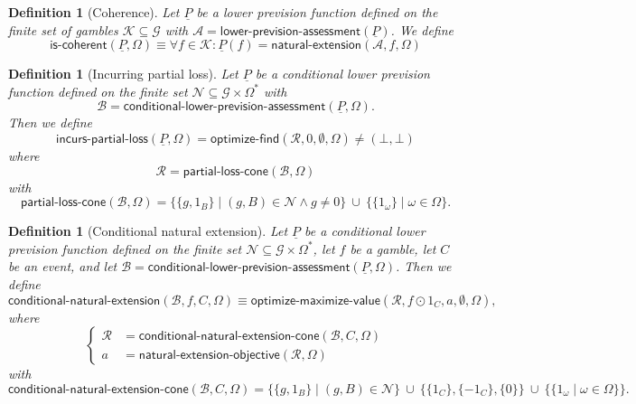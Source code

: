 \documentclass{article}
\theoremstyle{mytheorem}
\newtheorem{definition}[theorem]{Definition}
\newcommand{\func}[1]{\ensuremath{\textsf{#1}}} %
\newcommand{\set}[1]{\ensuremath{\{ #1 \} }} %
\begin{document}
\begin{definition}[Coherence]
Let $\underline{P}$ be a lower prevision function defined on the finite set of gambles $\mathcal{K} \subseteq \mathcal{G}$ with $\mathcal{A} = \func{lower-prevision-assessment}(\underline{P})$. We define
\[
  \func{is-coherent}(\underline{P}, \Omega) \equiv
  \forall f \in \mathcal{K}: \underline{P}(f) = \func{natural-extension}(\mathcal{A}, f, \Omega)
\]
\end{definition}

\begin{definition}[Incurring partial loss]
Let $\underline{P}$ be a conditional lower prevision function defined on the finite set $\mathcal{N} \subseteq \mathcal{G} \times \Omega^\ast$ with
\[\mathcal{B} = \func{conditional-lower-prevision-assessment}(\underline{P}, \Omega).
\]
Then we define
\[
  \func{incurs-partial-loss}(\underline{P}, \Omega) =
  \func{optimize-find}(\mathcal{R}, 0, \emptyset, \Omega) \neq (\bot, \bot)
\]
where
\[
  \mathcal{R} = \func{partial-loss-cone}(\mathcal{B}, \Omega)
\]
with
\[
    \func{partial-loss-cone}(\mathcal{B}, \Omega) =
        \set{ \set{g, 1_B} \mid (g, B) \in \mathcal{N} \land g \neq 0 }
        ~\cup~ \set{ \set{1_\omega } \mid \omega \in \Omega }.
\]
\end{definition}

\begin{definition}[Conditional natural extension]
Let $\underline{P}$ be a conditional lower prevision function defined on the finite set $\mathcal{N} \subseteq \mathcal{G} \times \Omega^\ast$, let $f$ be a gamble, let $C$ be an event, and let $\mathcal{B} = \func{conditional-lower-prevision-assessment}(\underline{P}, \Omega)$.
Then we define
\[
  \func{conditional-natural-extension}(\mathcal{B}, f, C, \Omega) \equiv \func{optimize-maximize-value}(\mathcal{R}, f \odot 1_C, a, \emptyset, \Omega),
\]
where
\[
  \left\{
  \begin{array}{ll}
    \mathcal{R} &= \func{conditional-natural-extension-cone}(\mathcal{B}, C, \Omega) \\[0.1cm]
    a &= \func{natural-extension-objective}(\mathcal{R}, \Omega)
  \end{array}
  \right.
\]
with
\[
    \func{conditional-natural-extension-cone}(\mathcal{B}, C, \Omega) =
        \set{ \set{g, 1_B} \mid (g, B) \in \mathcal{N} }
        ~\cup~ \set{ \set{1_C}, \set{-1_C}, \set{0} }
        ~\cup~ \set{ \set{1_\omega \mid \omega \in \Omega } }.
\]
\end{definition}
\end{document}
